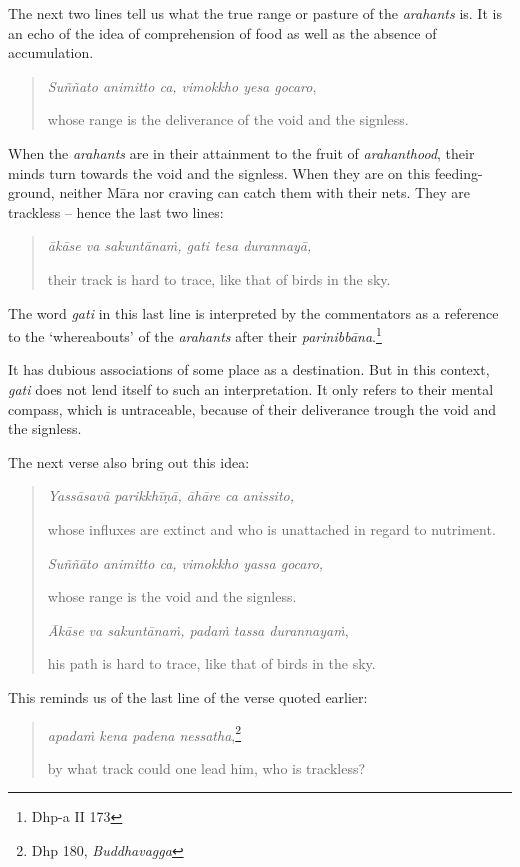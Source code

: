 The next two lines tell us what the true range or pasture of the \emph{arahants} is. It is an echo of the idea of comprehension of food as well as the absence of accumulation.

\begin{quote}
\emph{Suññato animitto ca, vimokkho yesa gocaro},

whose range is the deliverance of the void and the signless.
\end{quote}

When the \emph{arahants} are in their attainment to the fruit of \emph{arahanthood}, their minds turn towards the void and the signless. When they are on this feeding-ground, neither Māra nor craving can catch them with their nets. They are trackless -- hence the last two lines:

\begin{quote}
\emph{ākāse va sakuntānaṁ, gati tesa durannayā,}

their track is hard to trace, like that of birds in the sky.
\end{quote}

The word \emph{gati} in this last line is interpreted by the commentators as a reference to the `whereabouts' of the \emph{arahants} after their \emph{parinibbāna}.\footnote{Dhp-a II 173}

It has dubious associations of some place as a destination. But in this context, \emph{gati} does not lend itself to such an interpretation. It only refers to their mental compass, which is untraceable, because of their deliverance trough the void and the signless.

The next verse also bring out this idea:

\begin{quote}
\emph{Yassāsavā parikkhīṇā, āhāre ca anissito,}

whose influxes are extinct and who is unattached in regard to nutriment.

\emph{Suññāto animitto ca, vimokkho yassa gocaro,}

whose range is the void and the signless.

\emph{Ākāse va sakuntānaṁ, padaṁ tassa durannayaṁ},

his path is hard to trace, like that of birds in the sky.
\end{quote}

This reminds us of the last line of the verse quoted earlier:

\begin{quote}
\emph{apadaṁ kena padena nessatha},\footnote{Dhp 180, \emph{Buddhavagga}}

by what track could one lead him, who is trackless?
\end{quote}

